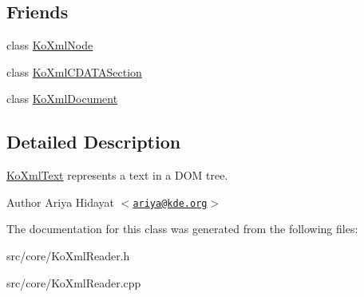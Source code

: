 \subsection*{Friends}
\begin{DoxyCompactItemize}
\item 
\hypertarget{classKoXmlText_a6c97883f92c7cbf2ecdf17db6cea8297}{
class \hyperlink{classKoXmlText_a6c97883f92c7cbf2ecdf17db6cea8297}{KoXmlNode}}
\label{classKoXmlText_a6c97883f92c7cbf2ecdf17db6cea8297}

\item 
\hypertarget{classKoXmlText_a50466abdb6ebb6b27c8066ac0dd926cc}{
class \hyperlink{classKoXmlText_a50466abdb6ebb6b27c8066ac0dd926cc}{KoXmlCDATASection}}
\label{classKoXmlText_a50466abdb6ebb6b27c8066ac0dd926cc}

\item 
\hypertarget{classKoXmlText_a7f0a67ef52ddc6542737225a82e4f487}{
class \hyperlink{classKoXmlText_a7f0a67ef52ddc6542737225a82e4f487}{KoXmlDocument}}
\label{classKoXmlText_a7f0a67ef52ddc6542737225a82e4f487}

\end{DoxyCompactItemize}


\subsection{Detailed Description}
\hyperlink{classKoXmlText}{KoXmlText} represents a text in a DOM tree. \begin{DoxyAuthor}{Author}
Ariya Hidayat $<$\href{mailto:ariya@kde.org}{\tt ariya@kde.org}$>$ 
\end{DoxyAuthor}


The documentation for this class was generated from the following files:\begin{DoxyCompactItemize}
\item 
src/core/KoXmlReader.h\item 
src/core/KoXmlReader.cpp\end{DoxyCompactItemize}
